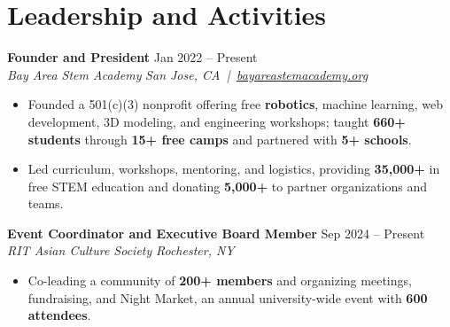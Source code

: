 \documentclass[10pt,letterpaper]{article}
\newif\ifresumeFirstRole
\newcommand{\resumeRole}[4]{%
  \ifresumeFirstRole
    \global\resumeFirstRolefalse
  \else
    \vspace{0pt plus 1fill}%
  \fi
  \textbf{#1} \hfill #2\\
  \textit{#3} \hfill \textit{#4}
}
\begin{document}
\section*{Leadership and Activities}
\resumeRole{Founder and President}{Jan 2022 -- Present}{Bay Area Stem Academy}{San Jose, CA \,|\, \href{https://bayareastemacademy.org}{bayareastemacademy.org}}
\begin{itemize}
  \item Founded a 501(c)(3) nonprofit offering free \textbf{robotics}, machine learning, web development, 3D modeling, and engineering workshops; taught \textbf{660+ students} through \textbf{15+ free camps} and partnered with \textbf{5+ schools}.
  \item Led curriculum, workshops, mentoring, and logistics, providing \textbf{\textdollar{}35,000+} in free STEM education and donating \textbf{\textdollar{}5,000+} to partner organizations and teams.
\end{itemize}

\resumeRole{Event Coordinator and Executive Board Member}{Sep 2024 -- Present}{RIT Asian Culture Society}{Rochester, NY}
\begin{itemize}
  \item Co-leading a community of \textbf{200+ members} and organizing meetings, fundraising, and Night Market, an annual university-wide event with \textbf{600 attendees}.
\end{itemize}
\end{document}
